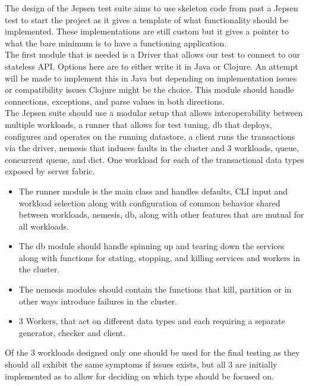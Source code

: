 \documentclass[a4paper,10pt,titlepage]{report}
\begin{document}
    The design of the Jepsen test suite aims to use skeleton code from past a Jepsen test to start the project as it gives a template of what functionality should be implemented. These implementations are still custom but it gives a pointer to what the bare minimum is to have a functioning application.
    \\
    The first module that is needed is a Driver that allows our test to connect to our stateless API. Options here are to either write it in Java or Clojure. An attempt will be made to implement this in Java but depending on implementation issues or compatibility issues Clojure might be the choice. This module should handle connections, exceptions, and parse values in both directions.
    \\
    The Jepsen suite should use a modular setup that allows interoperability between multiple workloads, a runner that allows for test tuning, db that deploys, configures and operates on the running datastore, a client runs the transactions via the driver, nemesis that induces faults in the cluster and 3 workloads, queue, concurrent queue, and dict. One workload for each of the transactional data types exposed by server fabric.
    \begin{itemize}
        \item The runner module is the main class and handles defaults, CLI input and workload selection along with configuration of common behavior shared between workloads, nemesis, db, along with other features that are mutual for all workloads.
        \item   The db module should handle spinning up and tearing down the services along with functions for stating, stopping, and killing services and workers in the cluster.

  \item  The nemesis modules should contain the functions that kill, partition or in other ways introduce failures in the cluster.

  \item 3 Workers, that act on different data types and each requiring a separate generator, checker and client.
    \end{itemize}
    
    Of the 3 workloads designed only one should be used for the final testing as they should all exhibit the same symptoms if issues exists, but all 3 are initially implemented as to allow for deciding on which type should be focused on.
    
\end{document}
